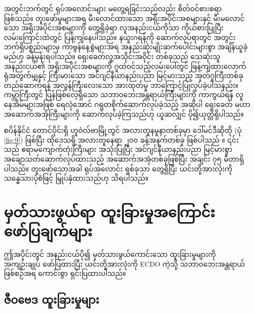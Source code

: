 \documentclass[10pt,twocolumn,letterpaper]{article}
\begin{document}
အတွင်းဘက်တွင် ရုပ်အလောင်းများ မတွေ့ရခြင်းသည်လည်း စိတ်ဝင်စားစရာဖြစ်သည်။ တူးဖော်မှုများအရ မီးလောင်ထားသော အရိုးအပိုင်းအစများနှင့် မီးမလောင်သော အရိုးအပိုင်းအစများကို တွေ့ရှိခဲ့ရာ လူအနည်းငယ်ကိုသာ ကိုယ်စားပြုပြီး လမ်းကြောင်းထဲတွင် ပြန့်ကျဲနေပါသည်။ နယူးဂရန့်ကို ဆောက်လုပ်ရာတွင် အတွင်းဘက်ရှိပစ္စည်းများမှ ကာဗွန်နေ့စွဲများအရ အနည်းဆုံးမျိုးဆက်ပေါင်းများစွာ အချိန်ယူခဲ့မည်ဟု ခန့်မှန်းရပါသည်။ ရှေးခေတ်လူ့အသိုင်းအဝိုင်း တစ်ခုသည် သေဆုံးသူအနည်းငယ်၏ အရိုးအပိုင်းအစများကို ဂူထဲဝင်သည့်လမ်းပေါ်တွင် ဖြန့်ကျဲထားလောက်ရုံအတွက်မျှနှင့် ကြီးမားသော အင်ဂျင်နီယာနည်းပညာ မြင့်မားသည့် အုတ်ဂူကြီးတစ်ခု တည်ဆောက်ရန် အလွန်ကြီးလေးသော အားထုတ်မှု ဘာကြောင့်ပြုလုပ်ခဲ့ပါသနည်း။ ကမ္ဘာကြီးတွင် ပြန်ဖြစ်လေ့ရှိသော သဘာဝဘေးအန္တရာယ်ကြီးများကို ကာကွယ်ရန် လူနေအိမ်များအဖြစ် ရေလုံအောင် ဂရုတစိုက်ဆောက်လုပ်ခဲ့သည့် အဆိုပါ ရှေးခေတ် မဟာအဆောက်အအုံကြီးများကို ဆောက်လုပ်ခဲ့ကြသည်ဟု ယူဆလျှင် ပို၍ယုတ္တိရှိပါသည်။

စပိန်နိုင်ငံ တောင်ပိုင်းရှိ ဟူဝဲလ်ဗာမြို့တွင် အလားတူနမူနာတစ်ခုမှာ ဒေါ်မင်ဒီဆိုတို (ပုံ \ref{fig:9}) ဖြစ်ပြီး ထိုဒေသရှိ အလားတူနေရာ ၂၀၀ ခန့်အနက်တစ်ခု ဖြစ်ပါသည် \cite{72,32}။ ၎င်းသည် ဧရာမကျောက်တုံးကြီးများ အသုံးပြုပြီး အင်ဂျင်နီယာနည်းပညာ မြင့်မားစွာ အချောသတ်ဆောက်လုပ်ထားသည့် အဆောက်အအုံတစ်ခုဖြစ်ပြီး အချင်း ၇၅ မီတာရှိပါသည်။ တူးဖော်သောအခါ ရုပ်အလောင်း ရှစ်ခုသာ တွေ့ရှိပြီး ယင်းတို့အားလုံးကို သန္ဓေသားပုံစံဖြင့် မြှုပ်နှံထားသည်ဟု သိရပါသည်။

\section{မှတ်သားဖွယ်ရာ ထူးခြားမှုအကြောင်း ဖော်ပြချက်များ}

ဤအပိုင်းတွင် အနည်းငယ်ပို၍ မှတ်သားဖွယ်ကောင်းသော ထူးခြားမှုများကို အကျဉ်းချုပ် ဖော်ပြထားပြီး ယင်းတို့အားလုံးကို ECDO ကဲ့သို့ သဘာဝဘေးအန္တရာယ်ဖြစ်စဉ်အရ ကောင်းစွာ ရှင်းပြထားပါသည်။

\subsection{ဇီဝဗေဒ ထူးခြားမှုများ}
\end{document}

